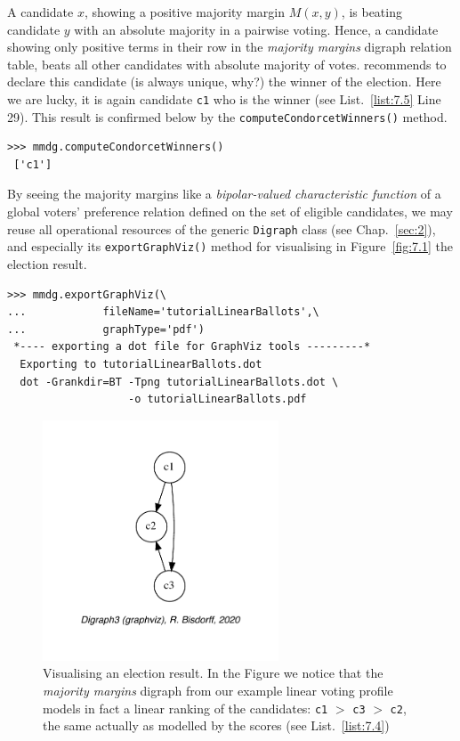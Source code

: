 A candidate $x$, showing a positive majority margin $M(x,y)$, is beating candidate $y$  with an absolute majority in a pairwise voting. Hence, a candidate showing only positive terms in their row in the \emph{majority margins} digraph relation table, beats all other candidates with absolute majority of votes. \Condorcet recommends to declare this candidate (is always unique, why?) the winner of the election. Here we are lucky, it is again candidate \texttt{c1} who is the \Condorcet winner (see List.~\vref{list:7.5} Line 29). This result is confirmed below by the \texttt{computeCondorcetWinners()} method. 
\begin{lstlisting}
>>> mmdg.computeCondorcetWinners()
 ['c1']  
\end{lstlisting}    

By seeing the majority margins like a \emph{bipolar-valued characteristic function} of a global voters' preference relation defined on the set of eligible candidates, we may reuse all operational resources of the generic \texttt{Digraph} class (see Chap.~\ref{sec:2}), and especially its \texttt{exportGraphViz()} method for visualising in Figure~\vref{fig:7.1} the election result.
\begin{lstlisting}
>>> mmdg.exportGraphViz(\
...            fileName='tutorialLinearBallots',\
...            graphType='pdf')
 *---- exporting a dot file for GraphViz tools ---------*
  Exporting to tutorialLinearBallots.dot
  dot -Grankdir=BT -Tpng tutorialLinearBallots.dot \
                   -o tutorialLinearBallots.pdf
\end{lstlisting}
\begin{figure}[ht]
\sidecaption[t]
\includegraphics[width=7cm]{Figures/7-1-tutorialBallots.pdf}
\caption{Visualising an election result. In the Figure we notice that the \emph{majority margins} digraph from our example linear voting profile models in fact a linear ranking of the candidates: \texttt{c1} $>$ \texttt{c3} $>$ \texttt{c2}, the same actually as modelled by the \Borda scores (see List.~\vref{list:7.4})}
\label{fig:7.1}       %
\end{figure}

